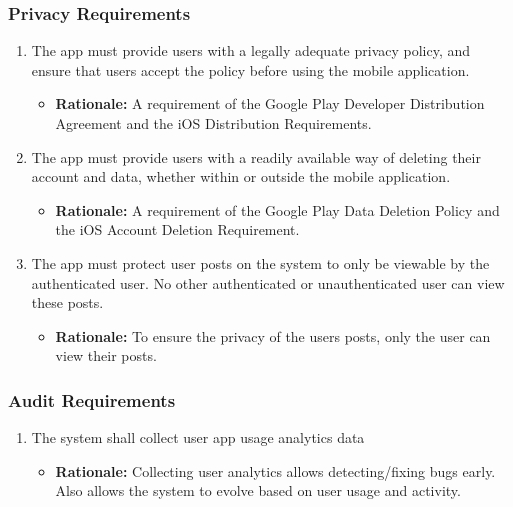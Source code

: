 \documentclass[]{article}
\begin{document}
\begin{enumerate}
\subsubsection{Privacy Requirements}
\label{ssub:privacy_requirements}
\begin{enumerate}[{SR-P}1. ]
\item The app must provide users with a legally adequate privacy policy, and ensure that users accept the policy before using the mobile application.
    \begin{itemize}
        \item \textbf{Rationale:} A requirement of the Google Play Developer Distribution Agreement and the iOS Distribution Requirements.
    \end{itemize}

\item The app must provide users with a readily available way of deleting their account and data, whether within or outside the mobile application.
    \begin{itemize}
        \item \textbf{Rationale:} A requirement of the Google Play Data Deletion Policy and the iOS Account Deletion Requirement.
    \end{itemize}

\item The app must protect user posts on the system to only be viewable by the authenticated user. No other authenticated or unauthenticated user can view these posts.
    \begin{itemize}
        \item \textbf{Rationale:} To ensure the privacy of the users posts, only the user can view their posts.
    \end{itemize}
\end{enumerate}

\subsubsection{Audit Requirements}
\label{ssub:audit_requirements}
\begin{enumerate}[{SR-AU}1. ]
\item The system shall collect user app usage analytics data
    \begin{itemize}
        \item \textbf{Rationale:} Collecting user analytics allows detecting/fixing bugs early. Also allows the system to evolve based on user usage and activity.
    \end{itemize}


\end{enumerate}
\end{enumerate}
\end{document}
